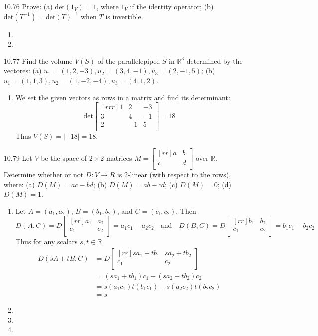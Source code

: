 \documentclass[12pt]{article}
\theoremstyle{definition}
\theoremstyle{plain}
\begin{document}
\begin{enumerate}
\item[10.76]Prove: (a) $\mathrm{det}(1_V)=1$, where $1_V$ if the identity operator; (b) $\mathrm{det}(T^{-1})=\mathrm{det}(T)^{-1}$ when $T$ is invertible.
	\begin{enumerate}
	\item
	\item
	\end{enumerate}
	
\item[10.77]Find the volume $V(S)$ of the parallelepiped $S$ in $\mathbb{R}^3$ determined by the vectores: (a) $u_1=(1,2,-3),u_2=(3,4,-1),u_3=(2,-1,5)$; (b) $u_1=(1,1,3),u_2=(1,-2,-4),u_3=(4,1,2)$.
	\begin{enumerate}
	\item We set the given vectors as rows in a matrix and find its determinant:
	\[ \mathrm{det}\begin{bmatrix}[rrr]1&2&-3\\3&4&-1\\2&-1&5\\\end{bmatrix} = 18 \]
	Thus $V(S) = |-18| = 18$.
	\end{enumerate}
	
\item[10.79]Let $V$ be the space of $2 \times 2$ matrices $M=\begin{bmatrix}[rr]a&b\\c&d\\\end{bmatrix}$ over $\mathbb{R}$. Determine whether or not $D: V\rightarrow R$ is 2-linear (with respect to the rows), where: (a) $D(M)=ac-bd$; (b) $D(M)=ab-cd$; (c) $D(M)=0$; (d) $D(M)=1$.
	\begin{enumerate}
	\item Let $A=(a_1,a_2)$, $B=(b_1,b_2)$, and $C=(c_1,c_2)$. Then
	\[ D(A,C)=D\begin{bmatrix}[rr]a_1&a_2\\c_1&c_2\\\end{bmatrix}=a_1c_1-a_2c_2 \quad \mathrm{and} \quad D(B,C) = D\begin{bmatrix}[rr]b_1&b_2\\c_1&c_2\\\end{bmatrix}=b_1c_1-b_2c_2 \]
	Thus for any scalars $s,t\in\mathbb{R}$
	\begin{align*}
	D(sA+tB,C)&=D\begin{bmatrix}[rr]sa_1+tb_1&sa_2+tb_2\\c_1&c_2\\\end{bmatrix}\\
	&= (sa_1+tb_1)c_1-(sa_2+tb_2)c_2\\
	&= s(a_1c_1)t(b_1c_1)-s(a_2c_2)t(b_2c_2)\\
	&= s
	\end{align*}
	\item
	\item
	\item
	\end{enumerate}
	

\end{enumerate}
\end{document}
